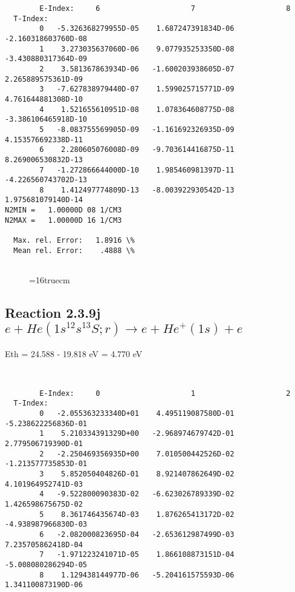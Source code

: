 \documentclass[12pt,dvipdfmx]{article}
\begin{document}
{\begin{small}
\begin{verbatim}
        E-Index:     6                     7                     8
  T-Index:
        0   -5.326368279955D-05    1.687247391834D-06   -2.160318603760D-08
        1    3.273035637060D-06    9.077935253350D-08   -3.430880317364D-09
        2    3.581367863934D-06   -1.600203938605D-07    2.265889575361D-09
        3   -7.627838979440D-07    1.599025715771D-09    4.761644881308D-10
        4    1.521655610951D-08    1.078364608775D-08   -3.386106465918D-10
        5   -8.083755569905D-09   -1.161692326935D-09    4.153576692338D-11
        6    2.280605076008D-09   -9.703614416875D-11    8.269006530832D-13
        7   -1.272866644000D-10    1.985460981397D-11   -4.226560743702D-13
        8    1.412497774809D-13   -8.003922930542D-13    1.975681079140D-14
N2MIN =   1.00000D 08 1/CM3
N2MAX =   1.00000D 16 1/CM3

  Max. rel. Error:   1.8916 \%
  Mean rel. Error:    .4888 \%


\end{verbatim}\end{small}
\begin{figure} \label{2.3.9i}
\epsfxsize=16truecm
\end{figure}
\newpage

\subsection{
Reaction 2.3.9j  $e + He(1s^12s^13S;r) \rightarrow e + He^+(1s) + e $
}
Eth = 24.588 - 19.818 eV = 4.770 eV


\begin{small}\begin{verbatim}


        E-Index:     0                     1                     2
  T-Index:
        0   -2.055363233340D+01    4.495119087580D-01   -5.238622256836D-01
        1    5.210334391329D+00   -2.968974679742D-01    2.779506719390D-01
        2   -2.250469356935D+00    7.010500442526D-02   -1.213577735853D-01
        3    5.852050404826D-01    8.921407862649D-02    4.101964952741D-03
        4   -9.522800090383D-02   -6.623026789339D-02    1.426598675675D-02
        5    8.361746435674D-03    1.876265413172D-02   -4.938987966830D-03
        6   -2.082000823695D-04   -2.653612987499D-03    7.235705862418D-04
        7   -1.971223241071D-05    1.866108873151D-04   -5.008080286294D-05
        8    1.129438144977D-06   -5.204161575593D-06    1.341100873190D-06


\end{verbatim}
\end{small}}
\end{document}
